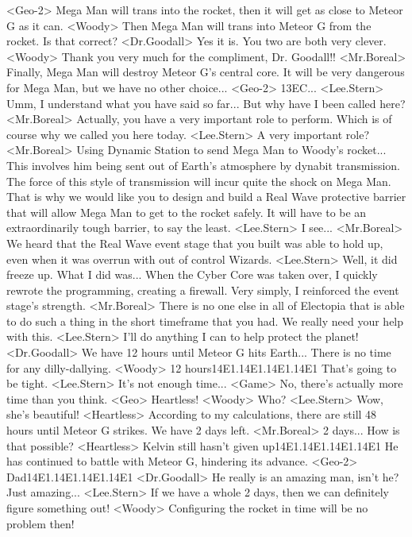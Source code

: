 <Geo-2> Mega Man will trans into the rocket, then it will get as close to Meteor G as it can. 
<Woody> Then Mega Man will trans into Meteor G from the rocket. 
Is that correct? 
<Dr.Goodall> Yes it is. 
You two are both very clever. 
<Woody> Thank you very much for the compliment, Dr. Goodall!! 
<Mr.Boreal> Finally, Mega Man will destroy Meteor G's central core. 
It will be very dangerous for Mega Man, but we have no other choice... 
<Geo-2> {13}{EC}... 
<Lee.Stern> Umm, I understand what you have said so far... 
But why have I been called here? 
<Mr.Boreal> Actually, you have a very important role to perform. 
Which is of course why we called you here today. 
<Lee.Stern> A very important role? 
<Mr.Boreal> Using Dynamic Station to send Mega Man to Woody's rocket... 
This involves him being sent out of Earth's atmosphere by dynabit transmission. 
The force of this style of transmission will incur quite the shock on Mega Man. 
That is why we would like you to design and build a 
Real Wave protective barrier that will allow Mega Man to get to the rocket safely. 
It will have to be an extraordinarily tough barrier, to say the least. 
<Lee.Stern> I see... 
<Mr.Boreal> We heard that the Real Wave event stage that you built was able to hold up, 
even when it was overrun with out of control Wizards. 
<Lee.Stern> Well, it did freeze up. 
What I did was... When the Cyber Core was taken over, I quickly 
rewrote the programming, creating a firewall. 
Very simply, I reinforced the event stage's strength. 
<Mr.Boreal> There is no one else in all of Electopia that is able to 
do such a thing in the short timeframe that you had. 
We really need your help with this. 
<Lee.Stern> I'll do anything I can to help protect the planet! 
<Dr.Goodall> We have 12 hours until Meteor G hits Earth... 
There is no time for any dilly-dallying. 
<Woody> 12 hours{14}{E1}.{14}{E1}.{14}{E1}.{14}{E1} That's going to be tight. 
<Lee.Stern> It's not enough time... 
<Game> No, there's actually more time than you think. 
<Geo> Heartless! 
<Woody> Who? 
<Lee.Stern> Wow, she's beautiful! 
<Heartless> According to my calculations, there are still 48 hours until Meteor G strikes. 
We have 2 days left. 
<Mr.Boreal> 2 days... How is that possible? 
<Heartless> Kelvin still hasn't given up{14}{E1}.{14}{E1}.{14}{E1}.{14}{E1} 
He has continued to battle with Meteor G, hindering its advance. 
<Geo-2> Dad{14}{E1}.{14}{E1}.{14}{E1}.{14}{E1} 
<Dr.Goodall> He really is an amazing man, isn't he? 
Just amazing... 
<Lee.Stern> If we have a whole 2 days, then we can definitely figure something out! 
<Woody> Configuring the rocket in time will be no problem then! 
